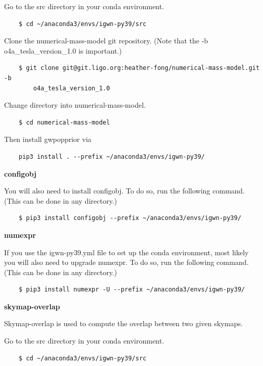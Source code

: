 Go to the src directory in your conda environment.

\begin{verbatim}
    $ cd ~/anaconda3/envs/igwn-py39/src
\end{verbatim}

Clone the numerical-mass-model git repository. (Note that the -b o4a\_tesla\_version\_1.0 is important.)

\begin{verbatim}
    $ git clone git@git.ligo.org:heather-fong/numerical-mass-model.git -b
        o4a_tesla_version_1.0
\end{verbatim}

Change directory into numerical-mass-model.

\begin{verbatim}
    $ cd numerical-mass-model
\end{verbatim}

Then install gwpopprior via

\begin{verbatim}
    pip3 install . --prefix ~/anaconda3/envs/igwn-py39/
\end{verbatim}

\textbf{configobj}

You will also need to install configobj. To do so, run the following command. (This can be done in any directory.)

\begin{verbatim}
    $ pip3 install configobj --prefix ~/anaconda3/envs/igwn-py39/
\end{verbatim}

\textbf{numexpr}

If you use the igwn-py39.yml file to set up the conda environment, most likely you will also need to upgrade numexpr. To do so, run the following command. (This can be done in any directory.)

\begin{verbatim}
    $ pip3 install numexpr -U --prefix ~/anaconda3/envs/igwn-py39/
\end{verbatim}

\textbf{skymap-overlap}

Skymap-overlap is used to compute the overlap between two given skymaps.

Go to the src directory in your conda environment.

\begin{verbatim}
    $ cd ~/anaconda3/envs/igwn-py39/src
\end{verbatim}

